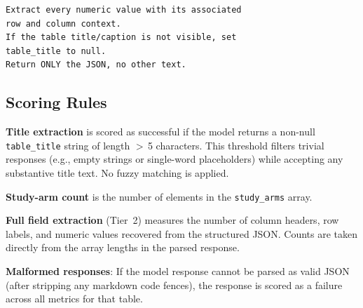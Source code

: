 \documentclass[pdflatex,sn-mathphys-num,iicol]{sn-jnl}
\begin{document}
\begin{appendices}
\begin{small}
\begin{verbatim}
Extract every numeric value with its associated
row and column context.
If the table title/caption is not visible, set
table_title to null.
Return ONLY the JSON, no other text.
\end{verbatim}
\end{small}

\subsection*{Scoring Rules}

\textbf{Title extraction} is scored as successful if the model returns a non-null
\texttt{table\_title} string of length $>$\,5 characters. This threshold filters
trivial responses (e.g., empty strings or single-word placeholders) while accepting
any substantive title text. No fuzzy matching is applied.

\textbf{Study-arm count} is the number of elements in the \texttt{study\_arms} array.

\textbf{Full field extraction} (Tier~2) measures the number of column headers,
row labels, and numeric values recovered from the structured JSON. Counts are taken
directly from the array lengths in the parsed response.

\textbf{Malformed responses}: If the model response cannot be parsed as valid JSON
(after stripping any markdown code fences), the response is scored as a failure
across all metrics for that table.

\end{appendices}
\end{document}
